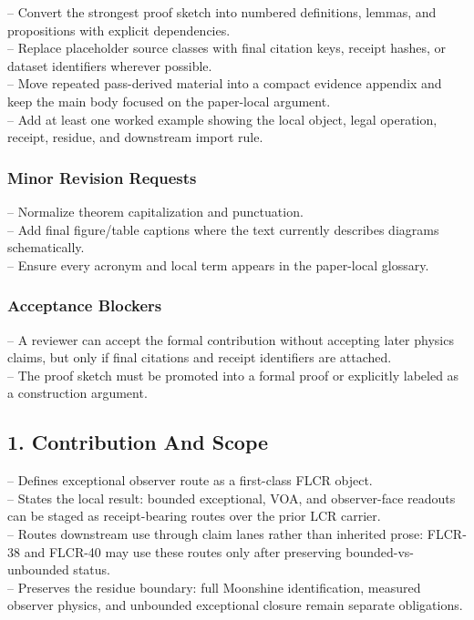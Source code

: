 \documentclass[11pt]{article}
\begin{document}
\noindent{}-- Convert the strongest proof sketch into numbered definitions, lemmas, and propositions with explicit dependencies.\\
\noindent{}-- Replace placeholder source classes with final citation keys, receipt hashes, or dataset identifiers wherever possible.\\
\noindent{}-- Move repeated pass-derived material into a compact evidence appendix and keep the main body focused on the paper-local argument.\\
\noindent{}-- Add at least one worked example showing the local object, legal operation, receipt, residue, and downstream import rule.\\

\subsubsection*{Minor Revision Requests}

\noindent{}-- Normalize theorem capitalization and punctuation.\\
\noindent{}-- Add final figure/table captions where the text currently describes diagrams schematically.\\
\noindent{}-- Ensure every acronym and local term appears in the paper-local glossary.\\

\subsubsection*{Acceptance Blockers}

\noindent{}-- A reviewer can accept the formal contribution without accepting later physics claims, but only if final citations and receipt identifiers are attached.\\
\noindent{}-- The proof sketch must be promoted into a formal proof or explicitly labeled as a construction argument.\\


\subsection*{1. Contribution And Scope}

\noindent{}-- Defines exceptional observer route as a first-class FLCR object.\\
\noindent{}-- States the local result: bounded exceptional, VOA, and observer-face readouts can be staged as receipt-bearing routes over the prior LCR carrier.\\
\noindent{}-- Routes downstream use through claim lanes rather than inherited prose: FLCR-38 and FLCR-40 may use these routes only after preserving bounded-vs-unbounded status.\\
\noindent{}-- Preserves the residue boundary: full Moonshine identification, measured observer physics, and unbounded exceptional closure remain separate obligations.\\
\end{document}
